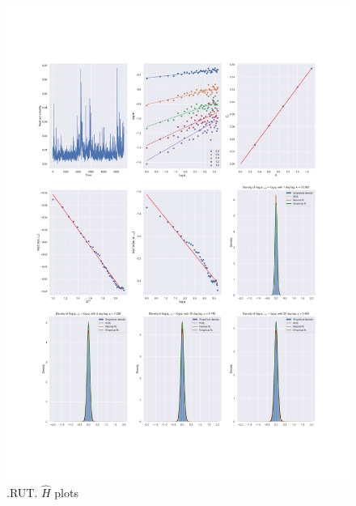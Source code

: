 	\begin{figure}[h]
		\centering
		\includegraphics[width=\linewidth]{fig/.RUT.pdf}
		\caption{.RUT. $\hat{H}$ plots}
	\end{figure}

